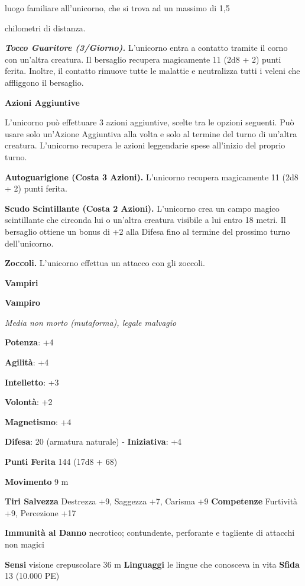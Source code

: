 \begin{multicols}{2}
luogo familiare all'unicorno, che si trova ad un massimo di 1,5

chilometri di distanza.

\emph{\textbf{Tocco Guaritore (3/Giorno).}} L'unicorno entra a contatto
tramite il corno con un'altra creatura. Il bersaglio recupera
magicamente 11 (2d8 + 2) punti ferita. Inoltre, il contatto rimuove
tutte le malattie e neutralizza tutti i veleni che affliggono il
bersaglio.

\textbf{Azioni Aggiuntive}

L'unicorno può effettuare 3 azioni aggiuntive, scelte tra le opzioni
seguenti. Può usare solo un'Azione Aggiuntiva alla volta e solo al
termine del turno di un'altra creatura. L'unicorno recupera le azioni
leggendarie spese all'inizio del proprio turno.

\textbf{Autoguarigione (Costa 3 Azioni).} L'unicorno recupera
magicamente 11 (2d8 + 2) punti ferita.

\textbf{Scudo Scintillante (Costa 2 Azioni).} L'unicorno crea un campo
magico scintillante che circonda lui o un'altra creatura visibile a lui
entro 18 metri. Il bersaglio ottiene un bonus di +2 alla Difesa fino al
termine del prossimo turno dell'unicorno.

\textbf{Zoccoli.} L'unicorno effettua un attacco con gli zoccoli.

\textbf{Vampiri}

\textbf{Vampiro}

\emph{Media non morto (mutaforma), legale malvagio}

\textbf{Potenza}: +4

\textbf{Agilità}: +4

\textbf{Intelletto}: +3

\textbf{Volontà}: +2

\textbf{Magnetismo}: +4

\textbf{Difesa}: 20 (armatura naturale) - \textbf{Iniziativa}: +4

\textbf{Punti Ferita} 144 (17d8 + 68)

\textbf{Movimento} 9 m

\textbf{Tiri Salvezza} Destrezza +9, Saggezza +7, Carisma +9
\textbf{Competenze} Furtività +9, Percezione +17

\textbf{Immunità al Danno} necrotico; contundente, perforante e
tagliente di attacchi non magici

\textbf{Sensi} visione crepuscolare 36 m
\textbf{Linguaggi} le lingue che conosceva in vita \textbf{Sfida} 13
(10.000 PE)


\end{multicols}
